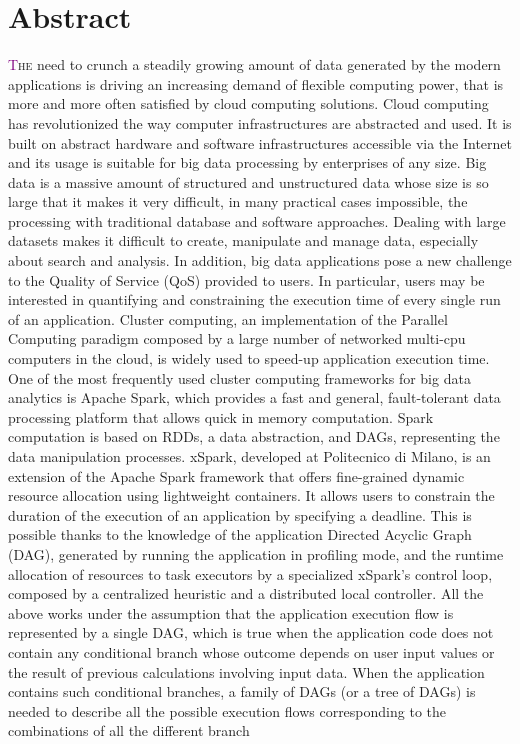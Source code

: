 
\begingroup
\let\clearpage\relax
\let\cleardoublepage\relax
\let\cleardoublepage\relax

\chapter*{Abstract}
\lettrine[lines=4]{\textcolor{purple}{T}}{he} need to crunch a steadily growing amount of data generated by the modern applications is driving an increasing demand of flexible computing power, that is more and more often satisfied by cloud computing solutions. Cloud computing has revolutionized the way computer infrastructures are abstracted and used. It is built on abstract hardware and software infrastructures accessible via the Internet and its usage is suitable for big data processing by enterprises of any size. Big data is a massive amount of structured and unstructured data whose size is so large that it makes it very difficult, in many practical cases impossible, the processing with traditional database and software approaches. Dealing with large datasets makes it difficult to create, manipulate and manage data, especially about search and analysis. In addition, big data applications pose a new challenge to the Quality of Service (QoS) provided to users. In particular, users may be interested in quantifying and constraining the execution time of every single run of an application. Cluster computing, an implementation of the Parallel Computing paradigm composed by a large number of networked multi-cpu computers in the cloud, is widely used to speed-up application execution time. One of the most frequently used cluster computing frameworks for big data analytics is Apache Spark, which provides a fast and general, fault-tolerant data processing platform that allows quick in memory computation. Spark computation is based on RDDs, a data abstraction, and DAGs, representing the data manipulation processes. xSpark, developed at Politecnico di Milano, is an extension of the Apache Spark framework that offers fine-grained dynamic resource allocation using lightweight containers. It allows users to constrain the duration of the execution of an application by specifying a deadline. This is possible thanks to the knowledge of the application Directed Acyclic Graph (DAG), generated by running the application in profiling mode, and the runtime allocation of resources to task executors by a specialized xSpark’s control loop, composed by a centralized heuristic and a distributed local controller. All the above works under the assumption that the application execution flow is represented by a single DAG, which is true when the application code does not contain any conditional branch whose outcome depends on user input values or the result of previous calculations involving input data. When the application contains such conditional branches, a family of DAGs (or a tree of DAGs) is needed to describe all the possible execution flows corresponding to the combinations of all the different branch 
